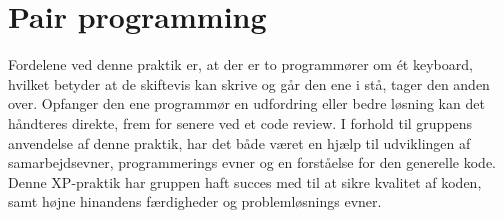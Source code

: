 \section{Pair programming}\label{sec:pairprogramming}
Fordelene ved denne praktik er, at der er to programmører om ét keyboard, 
hvilket betyder at de skiftevis kan skrive og går den ene i stå, tager den anden over. 
Opfanger den ene programmør en udfordring eller bedre løsning kan det håndteres direkte, 
frem for senere ved et code review. I forhold til gruppens anvendelse af denne praktik, har det både været en hjælp til 
udviklingen af samarbejdsevner, programmerings evner og en forståelse for den generelle kode. \\

Denne XP-praktik har gruppen haft succes med til at sikre kvalitet af koden, samt højne hinandens færdigheder og problemløsnings evner.
